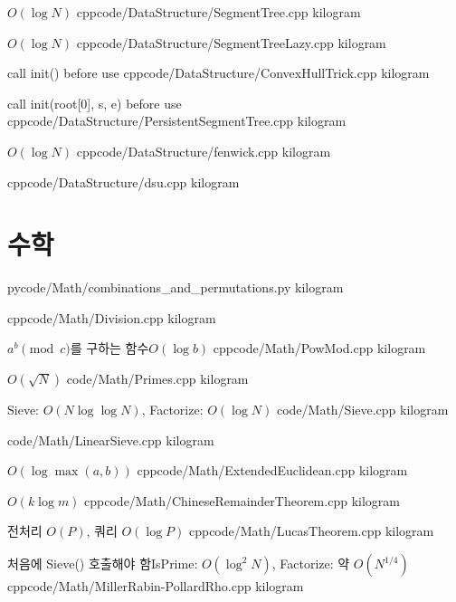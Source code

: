 \documentclass[landscape, 8pt, a4paper, twocolumn]{extarticle} %
\begin{document}
{}{$O(\log N)$}
{cpp}{code/DataStructure/SegmentTree.cpp}
{kilogram}

{}{$O(\log N)$}
{cpp}{code/DataStructure/SegmentTreeLazy.cpp}
{kilogram}

{call init() before use}{}
{cpp}{code/DataStructure/ConvexHullTrick.cpp}
{kilogram}

{call init(root[0], s, e) before use}{}
{cpp}{code/DataStructure/PersistentSegmentTree.cpp}
{kilogram}

{}{$O(\log N)$}
{cpp}{code/DataStructure/fenwick.cpp}
{kilogram}

{}{}
{cpp}{code/DataStructure/dsu.cpp}
{kilogram}

\section{수학}

{}{}
{py}{code/Math/combinations_and_permutations.py}
{kilogram}

{}{}
{cpp}{code/Math/Division.cpp}
{kilogram}

{$a^b \pmod c$를 구하는 함수}{$O(\log b)$}
{cpp}{code/Math/PowMod.cpp}
{kilogram}

{}{$O(\sqrt N)$}
{}{code/Math/Primes.cpp}
{kilogram}

{}{Sieve: $O(N \log \log N)$, Factorize: $O(\log N)$}
{}{code/Math/Sieve.cpp}
{kilogram}

{}{}
{}{code/Math/LinearSieve.cpp}
{kilogram}

{}{$O(\log \max(a,b))$}
{cpp}{code/Math/ExtendedEuclidean.cpp}
{kilogram}

{}{$O(k \log m)$}
{cpp}{code/Math/ChineseRemainderTheorem.cpp}
{kilogram}

{}{전처리 $O(P)$, 쿼리 $O(\log P)$}
{cpp}{code/Math/LucasTheorem.cpp}
{kilogram}

{처음에 Sieve() 호출해야 함}{IsPrime: $O(\log^2 N)$, Factorize: 약 $O(N^{1/4})$}
{cpp}{code/Math/MillerRabin-PollardRho.cpp}
{kilogram}
\end{document}
